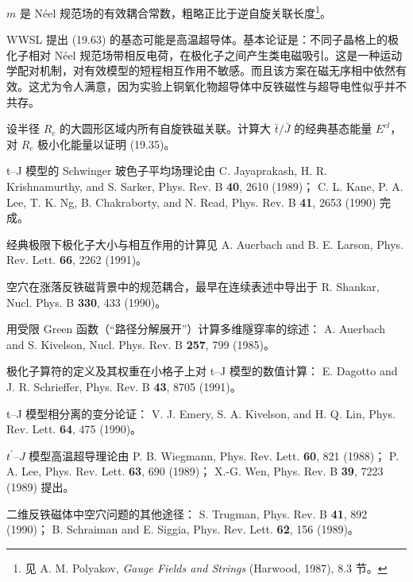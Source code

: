 $m$ 是 Néel 规范场的有效耦合常数，粗略正比于逆自旋关联长度\footnote{见 A. M. Polyakov, \textit{Gauge Fields and Strings} (Harwood, 1987), 8.3 节。}。

WWSL 提出 (19.63) 的基态可能是高温超导体。基本论证是：不同子晶格上的极化子相对 Néel 规范场带相反电荷，在极化子之间产生类电磁吸引。这是一种运动学配对机制，对有效模型的短程相互作用不敏感。而且该方案在磁无序相中依然有效。这尤为令人满意，因为实验上铜氧化物超导体中反铁磁性与超导电性似乎并不共存。

\begin{exercises}

\item 设半径 $R_{c}$ 的大圆形区域内所有自旋铁磁关联。计算大 $\bar{t}/\bar{J}$ 的经典基态能量 $E^{cl}$，对 $R_{c}$ 极小化能量以证明 (19.35)。

\end{exercises}

\begin{chapbib}
\item t--J 模型的 Schwinger 玻色子平均场理论由
  C. Jayaprakash, H. R. Krishnamurthy, and S. Sarker, Phys. Rev. B \textbf{40}, 2610 (1989)；
  C. L. Kane, P. A. Lee, T. K. Ng, B. Chakraborty, and N. Read, Phys. Rev. B \textbf{41}, 2653 (1990)
  完成。
\item 经典极限下极化子大小与相互作用的计算见
  A. Auerbach and B. E. Larson, Phys. Rev. Lett. \textbf{66}, 2262 (1991)。
\item 空穴在涨落反铁磁背景中的规范耦合，最早在连续表述中导出于
  R. Shankar, Nucl. Phys. B \textbf{330}, 433 (1990)。
\item 用受限 Green 函数（“路径分解展开”）计算多维隧穿率的综述：
  A. Auerbach and S. Kivelson, Nucl. Phys. Rev. B \textbf{257}, 799 (1985)。
\item 极化子算符的定义及其权重在小格子上对 t--J 模型的数值计算：
  E. Dagotto and J. R. Schrieffer, Phys. Rev. B \textbf{43}, 8705 (1991)。
\item t--J 模型相分离的变分论证：
  V. J. Emery, S. A. Kivelson, and H. Q. Lin, Phys. Rev. Lett. \textbf{64}, 475 (1990)。
\item $t^{\prime}$--$J$ 模型高温超导理论由
  P. B. Wiegmann, Phys. Rev. Lett. \textbf{60}, 821 (1988)；
  P. A. Lee, Phys. Rev. Lett. \textbf{63}, 690 (1989)；
  X.-G. Wen, Phys. Rev. B \textbf{39}, 7223 (1989)
  提出。
\item 二维反铁磁体中空穴问题的其他途径：
  S. Trugman, Phys. Rev. B \textbf{41}, 892 (1990)；
  B. Schraiman and E. Siggia, Phys. Rev. Lett. \textbf{62}, 156 (1989)。
\end{chapbib}

